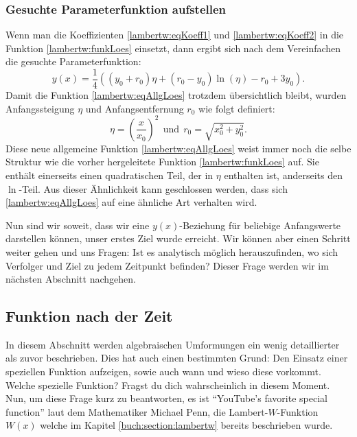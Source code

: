\subsubsection{Gesuchte Parameterfunktion aufstellen
	\label{lambertw:subsubsection:ParamFunk}}
Wenn man die Koeffizienten \eqref{lambertw:eqKoeff1} und \eqref{lambertw:eqKoeff2} in die Funktion \eqref{lambertw:funkLoes} einsetzt, dann ergibt sich nach dem Vereinfachen die gesuchte Parameterfunktion:
\begin{equation}
	y(x)
	=
	\frac{1}{4}\left(\left(y_0+r_0\right)\eta+\left(r_0-y_0\right)\operatorname{ln}\left(\eta\right)-r_0+3y_0\right).
	\label{lambertw:eqAllgLoes}
\end{equation}
Damit die Funktion \eqref{lambertw:eqAllgLoes} trotzdem übersichtlich bleibt, wurden Anfangssteigung \(\eta\) und Anfangsentfernung \(r_0\) wie folgt definiert:
\begin{equation}
	\eta
	=
	\left(\frac{x}{x_0}\right)^2
	\:\:\text{und}\:\:
	r_0
	=
	\sqrt{x_0^2+y_0^2}.
\end{equation}
Diese neue allgemeine Funktion \eqref{lambertw:eqAllgLoes} weist immer noch die selbe Struktur wie die vorher hergeleitete Funktion \eqref{lambertw:funkLoes} auf. Sie enthält einerseits einen quadratischen Teil, der in \(\eta\) enthalten ist, anderseits den \(\operatorname{ln}\)-Teil. Aus dieser Ähnlichkeit kann geschlossen werden, dass sich \eqref{lambertw:eqAllgLoes} auf eine ähnliche Art verhalten wird.

Nun sind wir soweit, dass wir eine \(y(x)\)-Beziehung für beliebige Anfangswerte darstellen können, unser erstes Ziel wurde erreicht. Wir können aber einen Schritt weiter gehen und uns Fragen: Ist es analytisch möglich herauszufinden, wo sich Verfolger und Ziel zu jedem Zeitpunkt befinden? Dieser Frage werden wir im nächsten Abschnitt nachgehen.

\subsection{Funktion nach der Zeit 
	\label{lambertw:subsection:FunkNachT}}
In diesem Abschnitt werden algebraischen Umformungen ein wenig detaillierter als zuvor beschrieben. Dies hat auch einen bestimmten Grund: Den Einsatz einer speziellen Funktion aufzeigen, sowie auch wann und wieso diese vorkommt. Welche spezielle Funktion? Fragst du dich wahrscheinlich in diesem Moment. Nun, um diese Frage kurz zu beantworten, es ist ``YouTube's favorite special function'' laut dem Mathematiker Michael Penn, die Lambert-\(W\)-Funktion \(W(x)\) welche im Kapitel \ref{buch:section:lambertw} bereits beschrieben wurde.

